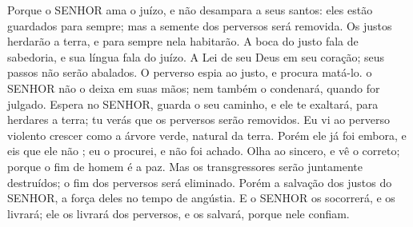 {  Porque o SENHOR ama o juízo, e não desampara a seus santos: eles estão guardados para sempre; mas a semente dos perversos será removida.
  Os justos herdarão a terra, e para sempre nela habitarão.
  A boca do justo fala de sabedoria, e sua língua fala do
{} juízo.
  A Lei de seu Deus
{} em seu coração; seus passos não serão abalados.
  O perverso espia ao justo, e procura matá-lo.
   o SENHOR não o deixa em suas mãos; nem também o condenará, quando for julgado.
  Espera no SENHOR, guarda o seu caminho, e ele te exaltará, para herdares a terra; tu verás que os perversos serão removidos.
  Eu vi ao perverso violento crescer como a árvore verde, natural da terra.
  Porém ele já foi embora, e eis que ele não
{} ; eu o procurei, e não foi achado.
  Olha ao sincero, e vê o correto; porque o fim de
{} homem é a paz.
  Mas os transgressores serão juntamente destruídos; o fim dos perversos será eliminado.
  Porém a salvação dos justos
{} do SENHOR,
{} a força deles no tempo de angústia.
  E o SENHOR os socorrerá, e os livrará; ele os livrará dos perversos, e os salvará, porque nele confiam.
\par }


